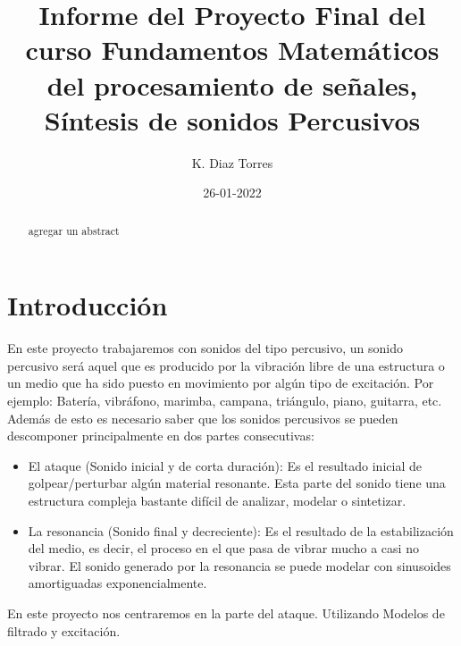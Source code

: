 \documentclass[11pt]{amsart}
\newcommand{\truncateit}[1]{\truncate{0.8\textwidth}{#1}}
\newcommand{\scititle}[1]{\title[\truncateit{#1}]{#1}}
\theoremstyle{plain}
\theoremstyle{definition}
\begin{document}
\begin{abstract}
 agregar un abstract 
\end{abstract}


\scititle{Informe del Proyecto Final del curso Fundamentos Matemáticos del procesamiento de señales, Síntesis de sonidos Percusivos}
\author{K. Diaz Torres}
\date{26-01-2022}
\maketitle











\section{Introducción}

 En este proyecto trabajaremos con sonidos del tipo percusivo, un sonido percusivo será aquel que es producido por la vibración libre de una estructura o un medio que ha sido puesto en movimiento por algún tipo de excitación. Por ejemplo: Batería, vibráfono, marimba, campana, triángulo, piano, guitarra, etc. Además de esto es necesario saber que los sonidos percusivos se pueden descomponer principalmente en dos partes consecutivas:\\
\begin{itemize}
\item El ataque (Sonido inicial y de corta duración): Es el resultado inicial de golpear/perturbar algún material resonante. Esta parte del sonido tiene una estructura compleja bastante difícil de analizar, modelar o sintetizar. 
\item La resonancia (Sonido final y decreciente): Es el resultado de la estabilización del medio, es decir, el proceso en el que pasa de vibrar mucho a casi no vibrar. El sonido generado por la resonancia se puede modelar con sinusoides amortiguadas exponencialmente.
\end{itemize}
 En este proyecto nos centraremos en la parte del ataque. Utilizando Modelos de filtrado y excitación.
\end{document}
